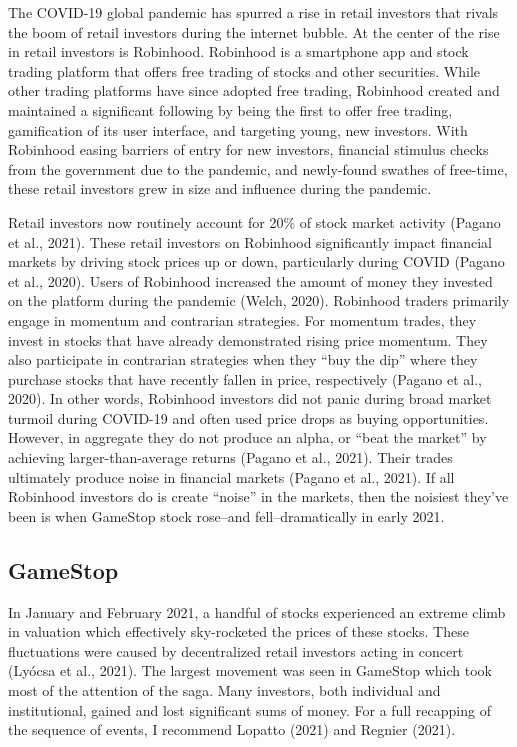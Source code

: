 \documentclass[12pt,]{article}
\begin{document}
The COVID-19 global pandemic has spurred a rise in retail investors that
rivals the boom of retail investors during the internet bubble. At the
center of the rise in retail investors is Robinhood. Robinhood is a
smartphone app and stock trading platform that offers free trading of
stocks and other securities. While other trading platforms have since
adopted free trading, Robinhood created and maintained a significant
following by being the first to offer free trading, gamification of its
user interface, and targeting young, new investors. With Robinhood
easing barriers of entry for new investors, financial stimulus checks
from the government due to the pandemic, and newly-found swathes of
free-time, these retail investors grew in size and influence during the
pandemic.

Retail investors now routinely account for 20\% of stock market activity
(Pagano et al., 2021). These retail investors on Robinhood significantly
impact financial markets by driving stock prices up or down,
particularly during COVID (Pagano et al., 2020). Users of Robinhood
increased the amount of money they invested on the platform during the
pandemic (Welch, 2020). Robinhood traders primarily engage in momentum
and contrarian strategies. For momentum trades, they invest in stocks
that have already demonstrated rising price momentum. They also
participate in contrarian strategies when they ``buy the dip'' where
they purchase stocks that have recently fallen in price, respectively
(Pagano et al., 2020). In other words, Robinhood investors did not panic
during broad market turmoil during COVID-19 and often used price drops
as buying opportunities. However, in aggregate they do not produce an
alpha, or ``beat the market'' by achieving larger-than-average returns
(Pagano et al., 2021). Their trades ultimately produce noise in
financial markets (Pagano et al., 2021). If all Robinhood investors do
is create ``noise'' in the markets, then the noisiest they've been is
when GameStop stock rose--and fell--dramatically in early 2021.

\hypertarget{gamestop}{%
\subsection{GameStop}\label{gamestop}}

In January and February 2021, a handful of stocks experienced an extreme
climb in valuation which effectively sky-rocketed the prices of these
stocks. These fluctuations were caused by decentralized retail investors
acting in concert (Lyócsa et al., 2021). The largest movement was seen
in GameStop which took most of the attention of the saga. Many
investors, both individual and institutional, gained and lost
significant sums of money. For a full recapping of the sequence of
events, I recommend Lopatto (2021) and Regnier (2021).
\end{document}
